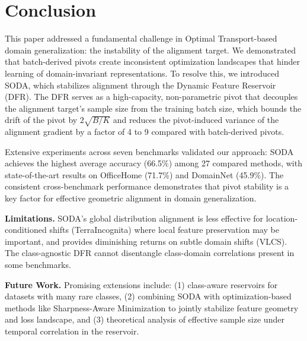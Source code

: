 \section{Conclusion}
\label{sec:conclusion}

This paper addressed a fundamental challenge in Optimal Transport-based domain generalization: the instability of the alignment target. We demonstrated that batch-derived pivots create inconsistent optimization landscapes that hinder learning of domain-invariant representations. To resolve this, we introduced SODA, which stabilizes alignment through the Dynamic Feature Reservoir (DFR). The DFR serves as a high-capacity, non-parametric pivot that decouples the alignment target's sample size from the training batch size, which bounds the drift of the pivot by $2\sqrt{B/K}$ and reduces the pivot-induced variance of the alignment gradient by a factor of 4 to 9 compared with batch-derived pivots.

Extensive experiments across seven benchmarks validated our approach: SODA achieves the highest average accuracy (66.5\%) among 27 compared methods, with state-of-the-art results on OfficeHome (71.7\%) and DomainNet (45.9\%). The consistent cross-benchmark performance demonstrates that pivot stability is a key factor for effective geometric alignment in domain generalization.

\textbf{Limitations.} SODA's global distribution alignment is less effective for location-conditioned shifts (TerraIncognita) where local feature preservation may be important, and provides diminishing returns on subtle domain shifts (VLCS). The class-agnostic DFR cannot disentangle class-domain correlations present in some benchmarks.

\textbf{Future Work.} Promising extensions include: (1) class-aware reservoirs for datasets with many rare classes, (2) combining SODA with optimization-based methods like Sharpness-Aware Minimization to jointly stabilize feature geometry and loss landscape, and (3) theoretical analysis of effective sample size under temporal correlation in the reservoir.